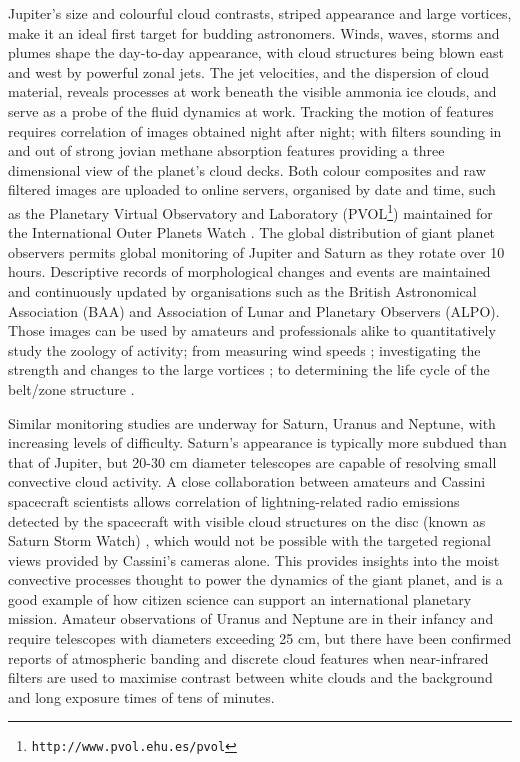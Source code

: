 \documentclass{ar2e}
\begin{document}
Jupiter's size and colourful cloud contrasts, striped appearance and large
vortices, make it an ideal first target for budding astronomers.  Winds, waves,
storms and plumes shape the day-to-day appearance, with cloud structures being
blown east and west by powerful zonal jets.  The jet velocities, and the
dispersion of cloud material, reveals processes at work beneath the visible
ammonia ice clouds, and serve as a probe of the fluid dynamics at work. 
Tracking the motion of features requires correlation of images obtained night
after night; with filters sounding in and out of strong jovian methane
absorption features providing a three dimensional view of the planet's cloud
decks.  Both colour composites and raw filtered images are uploaded to online
servers, organised by date and time, such as the Planetary Virtual Observatory
and Laboratory (PVOL\footnote{\texttt{http://www.pvol.ehu.es/pvol}}) maintained
for the International Outer Planets Watch \citep[IOPW][]{10hueso}.  The global
distribution of giant planet observers permits global monitoring of Jupiter and
Saturn as they rotate over 10 hours.  Descriptive records of morphological
changes and events are maintained and continuously updated by organisations such
as the British Astronomical Association (BAA) and Association of Lunar and
Planetary Observers (ALPO).   Those images can be used by amateurs and
professionals alike to quantitatively study the zoology of activity; from
measuring wind speeds \citep{08sanchez}; investigating the strength and changes
to the large vortices \citep[e.g., the 2006 reddening of Oval
BA,][]{06simon-miller}; to determining the life cycle of the belt/zone structure
\citep{96sanchez, 11fletcher}. 

Similar monitoring studies are underway for Saturn, Uranus and Neptune, with
increasing levels of difficulty.  Saturn's appearance is typically more
subdued than that of Jupiter, but 20-30 cm diameter telescopes are capable of
resolving small convective cloud activity.  A close collaboration between
amateurs and Cassini spacecraft scientists allows correlation of
lightning-related radio emissions detected by the spacecraft with visible
cloud structures on the disc (known as Saturn Storm Watch)
\citep[e.g.,][]{11fischer}, which would not be possible with the targeted
regional views provided by Cassini's cameras alone.  This provides insights
into the moist convective processes thought to power the dynamics of the giant
planet, and is a good example of how citizen science can support an
international planetary mission. Amateur observations of Uranus and Neptune
are in their infancy and require telescopes with diameters exceeding 25 cm,
but there have been confirmed reports of atmospheric banding and discrete
cloud features when near-infrared filters are used to maximise contrast
between white clouds and the background and long exposure times of tens of
minutes.
\end{document}
